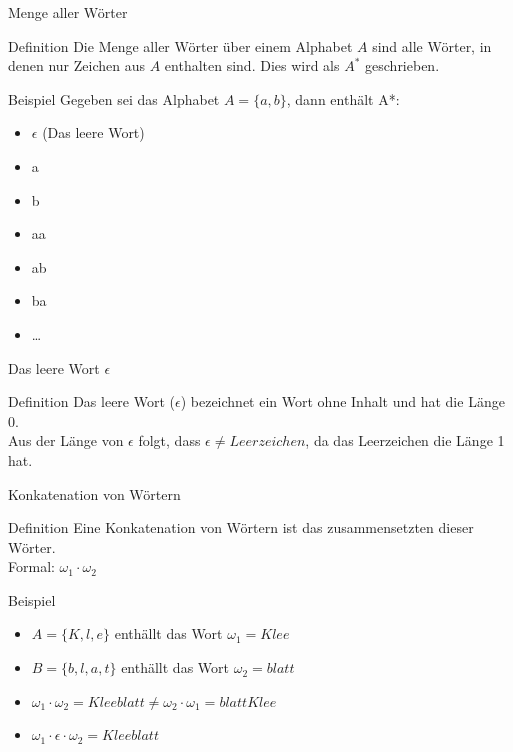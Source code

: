 \documentclass[18pt]{beamer}
\begin{document}
	
	\begin{frame} {Menge aller W\"orter}
		\begin{block} {Definition}
			Die Menge aller W\"orter \"uber einem Alphabet $A$ sind alle W\"orter, in denen nur Zeichen aus $A$ enthalten sind. Dies wird als $A^*$ geschrieben.
		\end{block}
		\pause
		\begin{exampleblock} {Beispiel}
			Gegeben sei das Alphabet $A = \{a, b\}$, dann enth\"alt A*: \\
			\begin{itemize}
				\item $\epsilon$ (Das leere Wort)
				\item a
				\item b
				\item aa
				\item ab
				\item ba
				\item \dots
			\end{itemize}
		\end{exampleblock}
	\end{frame}
	
	
	\begin{frame} {Das leere Wort $\epsilon$}
		\begin{block} {Definition}
			Das leere Wort ($\epsilon$) bezeichnet ein Wort ohne Inhalt und hat die L\"ange 0.\\
			Aus der L\"ange von $\epsilon$ folgt, dass $\epsilon \not= Leerzeichen$, da das Leerzeichen die L\"ange 1 hat.		
		\end{block}
	\end{frame}
	
	
	\begin{frame} {Konkatenation von W\"ortern}
		\begin{block} {Definition}
			Eine Konkatenation von W\"ortern ist das zusammensetzten dieser W\"orter.\\
			Formal: $\omega_1 \cdot \omega_2$
		\end{block}
		
		\pause		
		
		\begin{exampleblock} {Beispiel}
			\begin{itemize}
				\item $A = \{K, l, e\}$ enth\"allt das Wort $\omega_1 = Klee$
				\item $B = \{b, l, a, t\}$ enth\"allt das Wort $\omega_2 = blatt$
				\pause
				\item $\omega_1 \cdot \omega_2 = Kleeblatt \not= \omega_2 \cdot \omega_1 = blattKlee$
				\pause
				\item $\omega_1 \cdot \epsilon \cdot \omega_2 = Kleeblatt$
			\end{itemize}
		\end{exampleblock}
	\end{frame}
	
\end{document}
